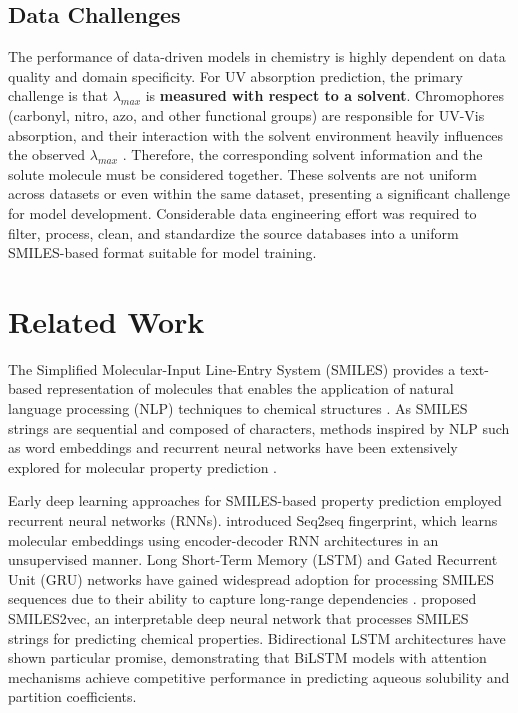 \documentclass[11pt,a4paper]{article}
\begin{document}
\subsection{Data Challenges}

The performance of data-driven models in chemistry is highly dependent on data quality and domain specificity. For UV absorption prediction, the primary challenge is that $\lambda_{max}$ is \textbf{measured with respect to a solvent}. Chromophores (carbonyl, nitro, azo, and other functional groups) are responsible for UV-Vis absorption, and their interaction with the solvent environment heavily influences the observed $\lambda_{max}$ \cite{koplikUltravioletVisibleSpectrometry, clarkWhatCausesMolecules2013}. Therefore, the corresponding solvent information and the solute molecule must be considered together. These solvents are not uniform across datasets or even within the same dataset, presenting a significant challenge for model development. Considerable data engineering effort was required to filter, process, clean, and standardize the source databases into a uniform SMILES-based format suitable for model training.

\section{Related Work}


The Simplified Molecular-Input Line-Entry System (SMILES) provides a text-based representation of molecules that enables the application of natural language processing (NLP) techniques to chemical structures \citep{weiningerSMILESChemicalLanguage1988}. As SMILES strings are sequential and composed of characters, methods inspired by NLP such as word embeddings and recurrent neural networks have been extensively explored for molecular property prediction \citep{gohSMILES2VecInterpretableGeneralPurpose2018}.

Early deep learning approaches for SMILES-based property prediction employed recurrent neural networks (RNNs). \citet{xuSeq2seqFingerprintUnsupervised2017} introduced Seq2seq fingerprint, which learns molecular embeddings using encoder-decoder RNN architectures in an unsupervised manner. Long Short-Term Memory (LSTM) and Gated Recurrent Unit (GRU) networks have gained widespread adoption for processing SMILES sequences due to their ability to capture long-range dependencies \citep{GeneratingFocusedMolecule}. \citet{gohSMILES2VecInterpretableGeneralPurpose2018} proposed SMILES2vec, an interpretable deep neural network that processes SMILES strings for predicting chemical properties. Bidirectional LSTM architectures have shown particular promise, demonstrating that BiLSTM models with attention mechanisms achieve competitive performance in predicting aqueous solubility and partition coefficients.
\end{document}
